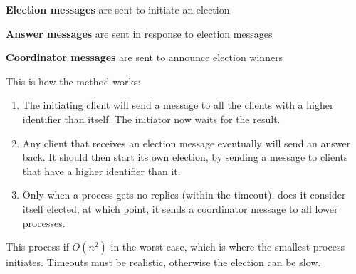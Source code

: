 \begin{description}
  \item \textbf{Election messages} are sent to initiate an election
  \item \textbf{Answer messages} are sent in response to election messages
  \item \textbf{Coordinator messages} are sent to announce election winners
\end{description}

This is how the method works:

\begin{enumerate}
  \item The initiating client will send a message to all the clients with a
  higher identifier than itself. The initiator now waits for the result.

  \item Any client that receives an election message eventually will send an
  answer back. It should then start its own election, by sending a message to
  clients that have a higher identifier than it.

  \item Only when a process gets no replies (within the timeout), does it
  consider itself elected, at which point, it sends a coordinator message to all
  lower processes.
\end{enumerate}

This process if $O(n^2)$ in the worst case, which is where the smallest process
initiates. Timeouts must be realistic, otherwise the election can be slow.
